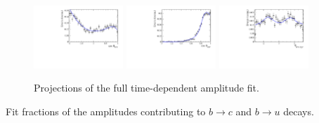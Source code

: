 \begin{figure}[h]
		\includegraphics[width=0.3\textwidth, height = !]{figs/fullFit/signal/h_cosTheta_Kpi.pdf} 
		\includegraphics[width=0.3\textwidth, height = !]{figs/fullFit/signal/h_cosTheta_Dspi.pdf} 
		\includegraphics[width=0.3\textwidth, height = !]{figs/fullFit/signal/h_phi_Kpi_Dspi.pdf} 
		

%

		\caption{Projections of the full time-dependent amplitude fit.} 		
		\label{fig:fullFit}
\end{figure}	
\begin{table}[h]
\centering
\caption{
Fit fractions of the amplitudes contributing to $b \to c$ and $b \to u$ decays.
}
	\renewcommand{\arraystretch}{1.5}
	
\label{tab:fullFractions}
\end{table}

